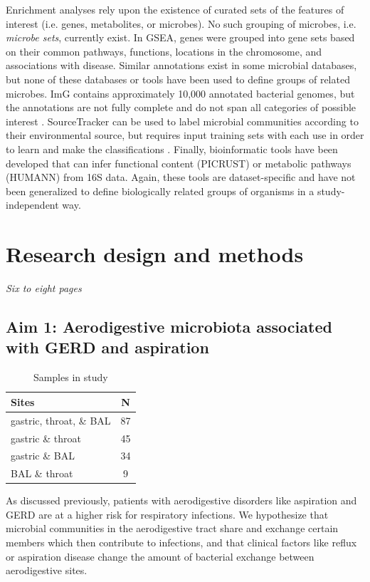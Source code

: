 \documentclass[12pt]{article}
\begin{document}
Enrichment analyses rely upon the existence of curated sets of the features of interest (i.e. genes, metabolites, or microbes).
No such grouping of microbes, i.e. \textit{microbe sets}, currently exist. 
In GSEA, genes were grouped into gene sets based on their common 
pathways, functions, locations in the chromosome, and associations 
with disease. Similar annotations exist in some microbial databases, 
but none of these databases or tools have been used to define groups 
of related microbes. ImG contains approximately 10,000 annotated 
bacterial genomes, but the annotations are not fully complete and do 
not span all categories of possible interest \cite{markowitz-img-2013}. SourceTracker 
can be used to label microbial communities according to their 
environmental source, but requires input training sets with each use 
in order to learn and make the classifications \cite{knights-sourcetracker-2011}. 
Finally, bioinformatic tools have been developed that can infer functional 
content (PICRUST) \cite{langille-picrust-2013} or metabolic pathways 
(HUMANN) \cite{abubucker-humann-2012} from 16S data. Again, 
these tools are dataset-specific and have not been generalized to 
define biologically related groups of organisms in a study-independent way.

\section{Research design and methods}
\textit{Six to eight pages}

\subsection{Aim 1: Aerodigestive microbiota associated with GERD and aspiration}

\begin{table}
\begin{tabular}{|l|c|}
	\hline
	\textbf{Sites} & \textbf{N} \\
	\hline
	gastric, throat, \& BAL & 87 \\
	gastric \& throat & 45 \\
	gastric \& BAL & 34 \\
	BAL \& throat & 9 \\
	\hline 
\end{tabular}
\caption{Samples in study}\label{tab:rosen_samples}
\end{table}

As discussed previously, patients with aerodigestive disorders like 
aspiration and GERD are at a higher risk for respiratory infections. 
We hypothesize that microbial communities in the aerodigestive tract 
share and exchange certain members which then contribute to 
infections, and that clinical factors like reflux or aspiration 
disease change the amount of bacterial exchange between aerodigestive 
sites.
\end{document}
